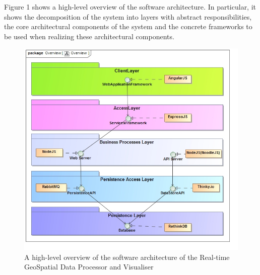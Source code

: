 Figure 1 shows a high-level overview of the software architecture. In particular, it shows the decomposition of the system into layers with abstract responsibilities, the core architectural components of the system and the concrete frameworks to be used when realizing these architectural components.

\begin{figure}[H]
\centering
\includegraphics[scale=0.6]{../images/Overview.jpg}
\caption{A high-level overview of the software architecture of the Real-time GeoSpatial Data Processor and Visualiser \label{overflow}}
\end{figure}